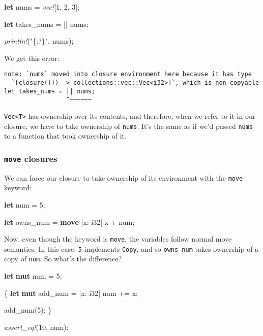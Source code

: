 \documentclass[a4paper,]{book}
\renewcommand*{\hypertarget}[3][\ar]{%
  \def\ar{#2}%
  \label{#1}%
  #3}
\newenvironment{Shaded}{\begin{snugshade}}{\end{snugshade}}
\newcommand{\KeywordTok}[1]{\textcolor[rgb]{0.13,0.29,0.53}{\textbf{{#1}}}}
\newcommand{\DataTypeTok}[1]{\textcolor[rgb]{0.13,0.29,0.53}{{#1}}}
\newcommand{\DecValTok}[1]{\textcolor[rgb]{0.00,0.00,0.81}{{#1}}}
\newcommand{\StringTok}[1]{\textcolor[rgb]{0.31,0.60,0.02}{{#1}}}
\newcommand{\PreprocessorTok}[1]{\textcolor[rgb]{0.56,0.35,0.01}{\textit{{#1}}}}
\newcommand{\NormalTok}[1]{{#1}}
\begin{document}
\begin{Shaded}
\begin{Highlighting}[]
\KeywordTok{let} \NormalTok{nums = }\PreprocessorTok{vec!}\NormalTok{[}\DecValTok{1}\NormalTok{, }\DecValTok{2}\NormalTok{, }\DecValTok{3}\NormalTok{];}

\KeywordTok{let} \NormalTok{takes_nums = || nums;}

\PreprocessorTok{println!}\NormalTok{(}\StringTok{"\{:?\}"}\NormalTok{, nums);}
\end{Highlighting}
\end{Shaded}

We get this error:

\begin{verbatim}
note: `nums` moved into closure environment here because it has type
  `[closure(()) -> collections::vec::Vec<i32>]`, which is non-copyable
let takes_nums = || nums;
                 ^~~~~~~
\end{verbatim}

\texttt{Vec\textless{}T\textgreater{}} has ownership over its contents,
and therefore, when we refer to it in our closure, we have to take
ownership of \texttt{nums}. It's the same as if we'd passed
\texttt{nums} to a function that took ownership of it.

\hypertarget{move-closures}{\subsubsection{\texorpdfstring{\texttt{move}
closures}{move closures}}\label{move-closures}}

We can force our closure to take ownership of its environment with the
\texttt{move} keyword:

\begin{Shaded}
\begin{Highlighting}[]
\KeywordTok{let} \NormalTok{num = }\DecValTok{5}\NormalTok{;}

\KeywordTok{let} \NormalTok{owns_num = }\KeywordTok{move} \NormalTok{|x: }\DataTypeTok{i32}\NormalTok{| x + num;}
\end{Highlighting}
\end{Shaded}

Now, even though the keyword is \texttt{move}, the variables follow
normal move semantics. In this case, \texttt{5} implements
\texttt{Copy}, and so \texttt{owns\_num} takes ownership of a copy of
\texttt{num}. So what's the difference?

\begin{Shaded}
\begin{Highlighting}[]
\KeywordTok{let} \KeywordTok{mut} \NormalTok{num = }\DecValTok{5}\NormalTok{;}

\NormalTok{\{}
    \KeywordTok{let} \KeywordTok{mut} \NormalTok{add_num = |x: }\DataTypeTok{i32}\NormalTok{| num += x;}

    \NormalTok{add_num(}\DecValTok{5}\NormalTok{);}
\NormalTok{\}}

\PreprocessorTok{assert_eq!}\NormalTok{(}\DecValTok{10}\NormalTok{, num);}
\end{Highlighting}
\end{Shaded}
\end{document}

